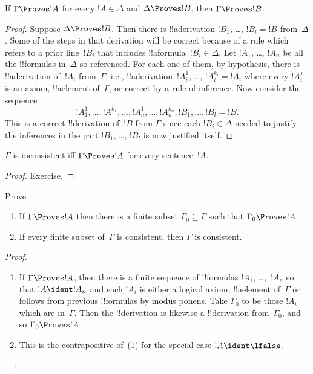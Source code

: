 \documentclass[../../../include/open-logic-section]{subfiles}
\begin{document}
\begin{prop}[Transitivity]
If $\Gamma \Proves !A$ for every $!A \in \Delta$ and $\Delta \Proves
!B$, then $\Gamma \Proves !B$.
\end{prop}

\begin{proof}
  Suppose $\Delta \Proves !B$. Then there is !!a{derivation} $!B_1$, \dots, $!B_l = !B$
  from~$\Delta$. Some of the steps in that derivation will be correct
  because of a rule which refers to a prior line~$!B_i$ that includes
  !!a{formula}~$!B_i \in \Delta$. Let $!A_1$, \dots, $!A_n$ be all the
  !!{formula}s in~$\Delta$ so referenced. For each one of them, by
  hypothesis, there is !!a{derivation} of~$!A_i$ from~$\Gamma$, i.e.,
  !!a{derivation}~$!A_i^1$, \dots, $!A_i^{k_i} = !A_i$ where every $!A_i^j$
  is an axiom, !!a{element} of~$\Gamma$, or correct by a rule of
  inference. Now consider the sequence
  \[
  !A_1^1, \dots, !A_1^{k_1}, \dots, !A_n^1, \dots, !A_n^{k_n}, !B_1, \dots, !B_l = !B.
  \]
  This is a correct !!{derivation} of~$!B$ from $\Gamma$ since each
  $!B_i \in \Delta$ needed to justify the inferences in the part
  $!B_1$, \dots, $!B_l$ is now justified itself.
\end{proof}
  
\begin{prop}
$\Gamma$ is inconsistent iff $\Gamma \Proves !A$ for every
  sentence~$!A$.
\end{prop}

\begin{proof}
Exercise.
\end{proof}

\begin{prob}
Prove 
\end{prob}

\begin{prop}[Compactness]
  \begin{enumerate}
  \item If $\Gamma \Proves !A$ then there is a finite subset $\Gamma_0
    \subseteq \Gamma$ such that $\Gamma_0 \Proves !A$.
  \item If every finite subset of~$\Gamma$ is
    consistent, then $\Gamma$ is consistent.
  \end{enumerate}
\end{prop}

\begin{proof}
  \begin{enumerate}
    \item If $\Gamma \Proves !A$, then there is a finite sequence of
      !!{formula}s $!A_1$, \dots,~$!A_n$ so that $!A \ident !A_n$ and
      each $!A_i$ is either a logical axiom, !!a{element} of~$\Gamma$
      or follows from previous !!{formula}s by modus ponens.  Take
      $\Gamma_0$ to be those $!A_i$ which are in~$\Gamma$.  Then the
      !!{derivation} is likewise a !!{derivation} from~$\Gamma_0$, and
      so $\Gamma_0 \Proves !A$.
    \item This is the contrapositive of~(1) for the special case $!A
      \ident \lfalse$.
\end{enumerate}
\end{proof}
\end{document}

